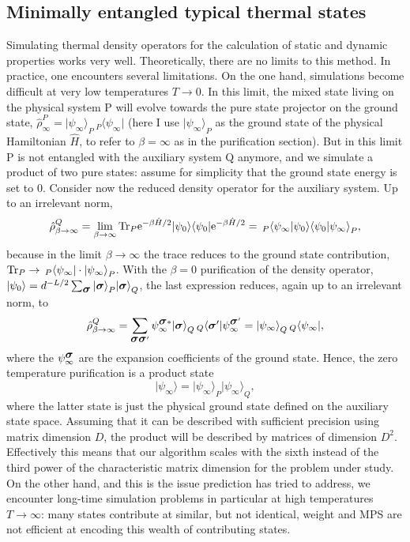 \documentclass[a4paper,10pt,oneside,onecolumn,1p,times]{elsarticle}
\newcommand{\tr}{{\rm Tr }}
\newcommand{\eul}{{\rm e }}
\newcommand{\bra}[1]{\mbox{$\langle #1  |$}}
\newcommand{\ket}[1]{\mbox{$| #1  \rangle$}}
\newcommand{\braket}[2]{\mbox{$\langle #1  | #2 \rangle$}} 	%
\newcommand{\fat}[1]{\mbox{\boldmath$#1$\unboldmath}}	%
\begin{document}
\subsection{Minimally entangled typical thermal states}
Simulating thermal density operators for the calculation of static and dynamic properties works very well. Theoretically, there are no limits to this method. In practice, one encounters several limitations. On the one hand, simulations become difficult at very low temperatures $T\rightarrow 0$. In this limit, the mixed state living on the physical system P will evolve towards the pure state projector on the ground state, $\hat{\rho}^P_\infty = \ket{\psi_\infty}_P \phantom{\,}_P\bra{\psi_\infty}$ (here I use $\ket{\psi_\infty}_P$ as the ground state of the physical Hamiltonian $\hat{H}$, to refer to $\beta=\infty$ as in the purification section). But in this limit P is not entangled with the auxiliary system Q anymore, and we simulate a product of two pure states: assume for simplicity that the ground state energy is set to 0. Consider now the reduced density operator for the auxiliary system. Up to an irrelevant norm, 
\begin{equation}
\hat{\rho}^Q_{\beta\rightarrow\infty} = \lim_{\beta\rightarrow\infty} \tr_P \eul^{-\beta\hat{H}/2} \ket{\psi_0} \bra{\psi_0} \eul^{-\beta\hat{H}/2} = \phantom{\,}_P\braket{\psi_\infty}{\psi_0} \braket{\psi_0}{\psi_\infty}_P ,
\end{equation}
because in the limit $\beta\rightarrow\infty$ the trace reduces to the ground state contribution,
$\tr_P \rightarrow \phantom{\,}_P\bra{\psi_\infty} \cdot \ket{\psi_\infty}_P$. With the $\beta=0$ purification of the density operator, $\ket{\psi_0} = d^{-L/2} \sum_{\fat{\sigma}} \ket{\fat{\sigma}}_P \ket{\fat{\sigma}}_Q$, the last expression reduces, again up to an irrelevant norm, to
\begin{equation}
\hat{\rho}^Q_{\beta\rightarrow\infty} = \sum_{\fat{\sigma}\fat{\sigma}'} \psi^{\fat{\sigma}*}_\infty \ket{\fat{\sigma}}_Q \phantom{\,}_Q \bra{\fat{\sigma}'} \psi^{\fat{\sigma}'}_\infty =
\ket{\psi_\infty}_Q \phantom{\,}_Q \bra{\psi_\infty} ,
\end{equation}
where the $\psi^{\fat{\sigma}}_\infty$ are the expansion coefficients of the ground state. Hence, the zero temperature purification is a product state 
\begin{equation}
\ket{\psi_\infty} = \ket{\psi_\infty}_P \ket{\psi_\infty}_Q,
\end{equation}
where the latter state is just the physical ground state defined on the auxiliary state space.
Assuming that it can be described with sufficient precision using matrix dimension $D$, the product will be described by matrices of dimension $D^2$. Effectively this means that our algorithm scales with the sixth instead of the third power of the characteristic matrix dimension for the problem under study. On the other hand, and this is the issue prediction has tried to address, we encounter long-time simulation problems in particular at high temperatures $T\rightarrow\infty$: many states contribute at similar, but not identical, weight and MPS are not efficient at encoding this wealth of contributing states.
\end{document}

